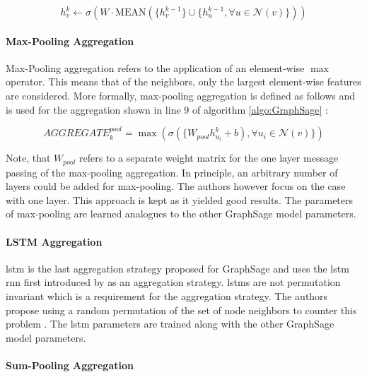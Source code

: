 	\begin{equation}
		h_{v}^{k} \leftarrow \sigma\left(W\cdot
		\text{MEAN}(\{h_{v}^{k-1}\}\cup\{h_{u}^{k-1},\forall u \in \mathcal{N}(v)\})\right)
	\end{equation}

	\paragraph{Max-Pooling Aggregation} \mbox{}

	\noindent Max-Pooling aggregation refers to the application of an 
	element-wise $\max$ operator. This means that of the neighbors, only the 
	largest element-wise features are considered. More formally, max-pooling 
	aggregation is defined as follows and is used for the aggregation shown in 
	line 9 of algorithm \ref{algo:GraphSage} \citep[p. 6]{hamilton2017inductive}:

	\begin{equation}
		AGGREGATE_{k}^{pool} = \max\left(\sigma(\{W_{pool}h_{u_{i}}^{k} +
		b),\forall u_{i} \in \mathcal{N}(v)\}\right)
	\end{equation}

	\noindent Note, that $W_{pool}$ refers to a separate weight matrix for the
	one layer message passing of the max-pooling aggregation. In principle, an 
	arbitrary number of layers could be added for max-pooling. The authors 
	\cite[p. 6]{hamilton2017inductive} however focus on the case with one layer. 
	This approach is kept as it yielded good results. The parameters of 
	max-pooling are learned analogues to the other GraphSage model parameters.

	\paragraph{LSTM Aggregation} \mbox{}

	\noindent \Acf{lstm} is the last aggregation strategy 
	proposed for GraphSage and uses the \acs{lstm} \acf{rnn} first introduced by
	\cite{hochreiter1997long} as an aggregation strategy. \acsp{lstm} are not
	permutation invariant which is a requirement for the aggregation strategy.
	The authors propose using a random permutation of the set of node neighbors 
	to counter this problem \citep[p. 5]{hamilton2017inductive}. The \acs{lstm}
	parameters are trained along with the other GraphSage model parameters. 

	\paragraph{Sum-Pooling Aggregation} \mbox{}
	\label{sum-pooling}
  
